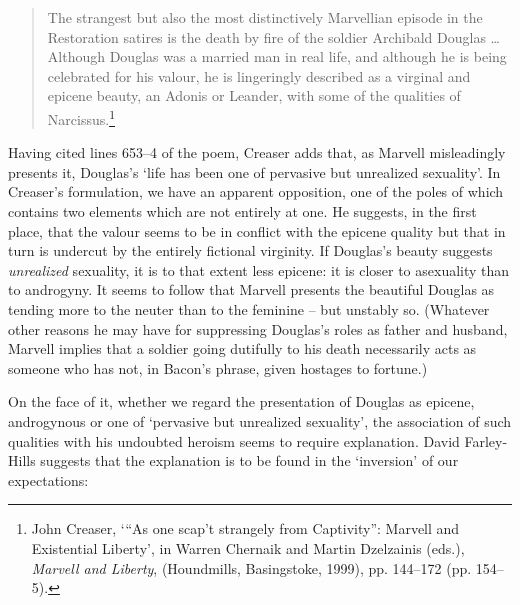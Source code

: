 ﻿\documentclass[12pt]{article}
\newcommand{\citedtitle}[1]{\textit{#1}}
\begin{document}
\begin{quote}
The strangest but also the most distinctively Marvellian episode in the Restoration
satires is the death by fire of the soldier Archibald Douglas … Although
Douglas was a married man in real life, and although he is being celebrated for
his valour, he is lingeringly described as a virginal and epicene beauty, an
Adonis or Leander, with some of the qualities of Narcissus.\footnote{John Creaser, ‘“As one
scap’t strangely from Captivity”: Marvell and Existential Liberty’, in Warren
Chernaik and Martin Dzelzainis (eds.), \citedtitle{Marvell and Liberty}, (Houndmills,
Basingstoke, 1999),  pp. 144–172 (pp. 154–5).}
\end{quote}
Having cited lines 653–4 of the poem, Creaser adds that, as Marvell misleadingly
presents it, Douglas’s ‘life has been one of pervasive but unrealized
sexuality’. In Creaser’s formulation, we have an apparent opposition, one of the
poles of which contains two elements which are not entirely at one. He
suggests, in the first place, that the valour seems to be in conflict with the
epicene quality but that in turn is undercut by the entirely fictional
virginity. If Douglas’s beauty suggests \emph{unrealized} sexuality, it is to
that extent less epicene: it is closer to asexuality than to androgyny. It
seems to follow that Marvell presents the beautiful Douglas as tending more to
the neuter than to the feminine – but unstably so. (Whatever other reasons he
may have for suppressing Douglas’s roles as father and husband, Marvell implies
that a soldier going dutifully to his death necessarily acts as someone who has
not, in Bacon’s phrase, given hostages to fortune.)

On
the face of it, whether we regard the presentation of Douglas as epicene,
androgynous or one of ‘pervasive but unrealized sexuality’, the association of
such qualities with his undoubted heroism seems to require explanation. David
Farley-Hills suggests that the explanation is to be found in the ‘inversion’ of
our expectations:
\end{document}
